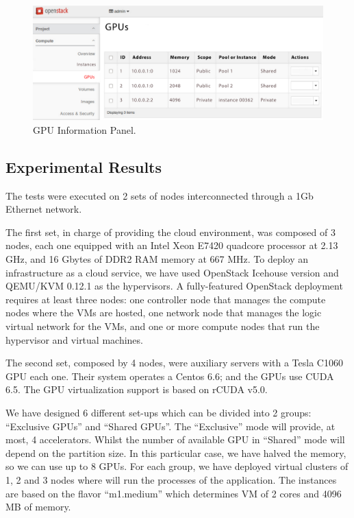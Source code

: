 \documentclass[a4paper,twoside]{article}
\begin{document}
\begin{figure}[htb]
  \centering
  \includegraphics[width=\linewidth]{images/UI-rgpus.pdf}
  \caption{GPU Information Panel.}
  \label{fig:ui-rgpus}
\end{figure}

\subsection{Experimental Results}
The tests were executed on 2 sets of nodes interconnected through a 1Gb Ethernet network.

The first set, in charge of providing the cloud environment,
was composed of 3 nodes, each one equipped with an Intel Xeon E7420 quadcore processor at
2.13 GHz, and 16 Gbytes of DDR2 RAM memory at 667 MHz.
To deploy an infrastructure as a cloud service, we have used OpenStack Icehouse version and QEMU/KVM 0.12.1 as the hypervisors.
A fully-featured OpenStack deployment requires at least three nodes: one controller node that manages the compute nodes 
where the VMs are hosted, one network node that manages the logic
virtual network for the VMs, and one or more compute nodes that 
run the hypervisor and virtual machines.

The second set, composed by 4 nodes, were auxiliary servers with a Tesla C1060 GPU each one. 
Their system operates a Centos 6.6; and the GPUs use CUDA 6.5. 
The GPU virtualization support is based on rCUDA v5.0. 

We have designed 6 different set-ups which can be divided
into 2 groups: “Exclusive GPUs” and “Shared GPUs”. The
“Exclusive” mode will provide, at most, 4 accelerators. Whilst
the number of available GPU in “Shared” mode will depend
on the partition size. In this particular case, we have halved
the memory, so we can use up to 8 GPUs. For each group, we
have deployed virtual clusters of 1, 2 and 3 nodes where will
run the processes of the application. The instances are based
on the flavor “m1.medium” which determines VM of 2 cores
and 4096 MB of memory.
\end{document}
